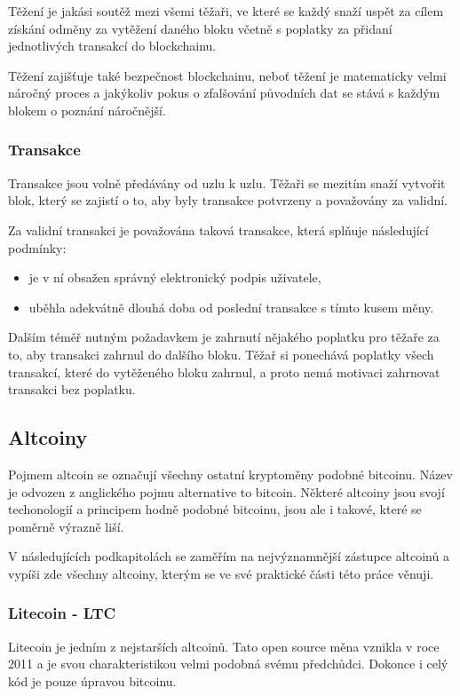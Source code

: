 \documentclass[thesis=B,czech]{FITthesis}[2019/03/21]
\begin{document}
Těžení je jakási soutěž mezi všemi těžaři, ve které se každý snaží uspět za cílem získání odměny za vytěžení daného bloku včetně s poplatky za přidaní jednotlivých transakcí do blockchainu.

Těžení zajišťuje také bezpečnost blockchainu, neboť těžení je matematicky velmi náročný proces a jakýkoliv pokus o zfalšování původních dat se stává s každým blokem o poznání náročnější. \cite{mastering_bitcoin}

\subsubsection{Transakce}
Transakce jsou volně předávány od uzlu k uzlu. Těžaři se mezitím snaží vytvořit blok, který se zajistí o to, aby byly transakce potvrzeny a považovány za validní.

Za validní transakci je považována taková transakce, která splňuje následující podmínky:
\begin{itemize}
    \item je v ní obsažen správný elektronický podpis uživatele,
    \item uběhla adekvátně dlouhá doba od poslední transakce s tímto kusem měny. \cite{Finex_blockchain}
\end{itemize}
Dalším téměř nutným požadavkem je zahrnutí nějakého poplatku pro těžaře za to, aby transakci zahrnul do dalšího bloku. Těžař si ponechává poplatky všech transakcí, které do vytěženého bloku zahrnul, a proto nemá motivaci zahrnovat transakci bez poplatku. \cite{Finex_blockchain}

\subsection{Altcoiny}
Pojmem altcoin se označují všechny ostatní kryptoměny podobné bitcoinu. Název je odvozen z anglického pojmu alternative to bitcoin. Některé altcoiny jsou svojí techonologií a principem hodně podobné bitcoinu, jsou ale i takové, které se poměrně výrazně liší. \cite{altcoin}

V následujících podkapitolách se zaměřím na nejvýznamnější zástupce altcoinů a vypíši zde všechny altcoiny, kterým se ve své praktické části této práce věnuji.

\subsubsection{Litecoin - LTC}
Litecoin je jedním z nejstarších altcoinů. Tato open source měna vznikla v roce 2011 a je svou charakteristikou velmi podobná svému předchůdci. \cite{litecoin} Dokonce i celý kód je pouze úpravou bitcoinu. \cite{alza_monero}
\end{document}
